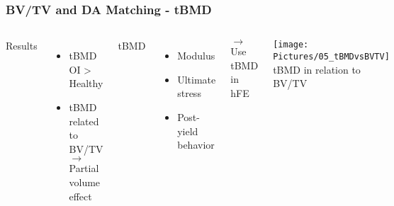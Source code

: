 \documentclass[xcolor=table,11pt]{beamer}
\begin{document}
\begin{frame}
	\frametitle{BV/TV and DA Matching - tBMD}
	\fontsize{10pt}{10pt}\selectfont
	\begin{columns}
				
		Results
		\begin{itemize}
			\item tBMD OI > Healthy
			\item tBMD related to BV/TV\\
			$\rightarrow$ Partial volume effect
		\end{itemize}
	
		\vspace{10pt}

		\cite{p12} tBMD
		\begin{itemize}
			\item Modulus
			\item Ultimate stress
			\item Post-yield behavior
		\end{itemize}
		
		\vspace{10pt}
		
		$\rightarrow$ Use tBMD in hFE
		
		\centering
		\texttt{[image: Pictures/05\_tBMDvsBVTV]}\\
		tBMD in relation to BV/TV
	\end{columns}
\end{frame}

\end{document}
